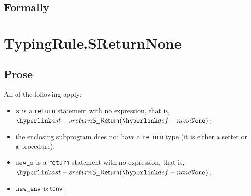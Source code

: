\subsection{Formally}


\section{TypingRule.SReturnNone \label{sec:TypingRule.SReturnNone}}

\subsection{Prose}
All of the following apply:
\begin{itemize}
  \item $\texttt{s}$ is a \texttt{return} statement with no expression, that is, $\SReturn(\None)$;
  \item the enclosing subprogram does not have a \texttt{return} type (it is either a setter
        or a procedure);
  \item $\texttt{new\_s}$ is a \texttt{return} statement with no expression, that is, $\SReturn(\None)$;
  \item $\texttt{new\_env}$ is $\textsf{tenv}$.
\end{itemize}


